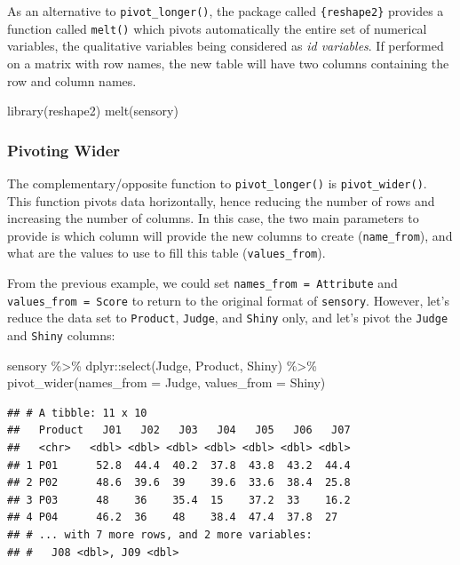 \documentclass[
]{krantz}
\makeatletter
\newenvironment{Shaded}{\begin{snugshade}}{\end{snugshade}}
\newcommand{\AttributeTok}[1]{\textcolor[rgb]{0.61,0.61,0.61}{#1}}
\newcommand{\FunctionTok}[1]{\textcolor[rgb]{0,0,0}{#1}}
\newcommand{\NormalTok}[1]{#1}
\newcommand{\SpecialCharTok}[1]{\textcolor[rgb]{0,0,0}{#1}}
\newenvironment{kframe}{%
\medskip{}
\setlength{\fboxsep}{.8em}
 \def\at@end@of@kframe{}%
 \ifinner\ifhmode%
  \def\at@end@of@kframe{\end{minipage}}%
  \begin{minipage}{\columnwidth}%
 \fi\fi%
 \def\FrameCommand##1{\hskip\@totalleftmargin \hskip-\fboxsep
 \colorbox{shadecolor}{##1}\hskip-\fboxsep
     \hskip-\linewidth \hskip-\@totalleftmargin \hskip\columnwidth}%
 \MakeFramed {\advance\hsize-\width
   \@totalleftmargin\z@ \linewidth\hsize
   \@setminipage}}%
 {\par\unskip\endMakeFramed%
 \at@end@of@kframe}
\renewenvironment{Shaded}{\begin{kframe}}{\end{kframe}}
\makeatother
\begin{document}
As an alternative to \texttt{pivot\_longer()}, the package called \texttt{\{reshape2\}} provides a function called \texttt{melt()} which pivots automatically the entire set of numerical variables, the qualitative variables being considered as \emph{id variables}. If performed on a matrix with row names, the new table will have two columns containing the row and column names.

\begin{Shaded}
\begin{Highlighting}[]
\FunctionTok{library}\NormalTok{(reshape2)}
\FunctionTok{melt}\NormalTok{(sensory)}
\end{Highlighting}
\end{Shaded}

\hypertarget{pivoting-wider}{%
\subsubsection{Pivoting Wider}\label{pivoting-wider}}

The complementary/opposite function to \texttt{pivot\_longer()} is \texttt{pivot\_wider()}. This function pivots data horizontally, hence reducing the number of rows and increasing the number of columns. In this case, the two main parameters to provide is which column will provide the new columns to create (\texttt{name\_from}), and what are the values to use to fill this table (\texttt{values\_from}).

From the previous example, we could set \texttt{names\_from\ =\ Attribute} and \texttt{values\_from\ =\ Score} to return to the original format of \texttt{sensory}. However, let's reduce the data set to \texttt{Product}, \texttt{Judge}, and \texttt{Shiny} only, and let's pivot the \texttt{Judge} and \texttt{Shiny} columns:

\begin{Shaded}
\begin{Highlighting}[]
\NormalTok{sensory }\SpecialCharTok{\%\textgreater{}\%}
\NormalTok{  dplyr}\SpecialCharTok{::}\FunctionTok{select}\NormalTok{(Judge, Product, Shiny) }\SpecialCharTok{\%\textgreater{}\%}
  \FunctionTok{pivot\_wider}\NormalTok{(}\AttributeTok{names\_from =}\NormalTok{ Judge, }\AttributeTok{values\_from =}\NormalTok{ Shiny)}
\end{Highlighting}
\end{Shaded}

\begin{verbatim}
## # A tibble: 11 x 10
##   Product   J01   J02   J03   J04   J05   J06   J07
##   <chr>   <dbl> <dbl> <dbl> <dbl> <dbl> <dbl> <dbl>
## 1 P01      52.8  44.4  40.2  37.8  43.8  43.2  44.4
## 2 P02      48.6  39.6  39    39.6  33.6  38.4  25.8
## 3 P03      48    36    35.4  15    37.2  33    16.2
## 4 P04      46.2  36    48    38.4  47.4  37.8  27  
## # ... with 7 more rows, and 2 more variables:
## #   J08 <dbl>, J09 <dbl>
\end{verbatim}
\end{document}

